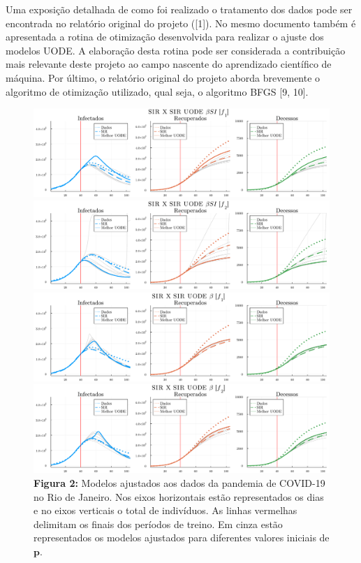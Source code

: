 \documentclass[a4paper,12pt]{article}
\begin{document}
Uma exposição detalhada de como foi realizado o tratamento dos dados pode ser encontrada no relatório original do projeto ([1]). No mesmo documento também é apresentada a rotina de otimização desenvolvida para realizar o ajuste dos modelos UODE. A elaboração desta rotina pode ser considerada a contribuição mais relevante deste projeto ao campo nascente do aprendizado científico de máquina. Por último, o relatório original do projeto aborda brevemente o algoritmo de otimização utilizado, qual seja, o algoritmo BFGS [9, 10].

\begin{figure}
	\centering
	\includegraphics[width=1\textwidth]{fit1.pdf}
	\par\vspace{0.1in}
	\includegraphics[width=1\textwidth]{fit2.pdf}
	\par\vspace{0.1in}
	\includegraphics[width=1\textwidth]{fit3.pdf}
	\par\vspace{0.1in}
	\includegraphics[width=1\textwidth]{fit4.pdf}
	
	\caption*{\textbf{Figura 2:} Modelos ajustados aos dados da pandemia de COVID-19 no Rio de Janeiro. Nos eixos horizontais estão representados os dias e no eixos verticais o total de indivíduos. As linhas vermelhas delimitam os finais dos períodos de treino. Em cinza estão representados os modelos ajustados para diferentes valores iniciais de $\mathbf{p}$. }
\end{figure}
\end{document}
